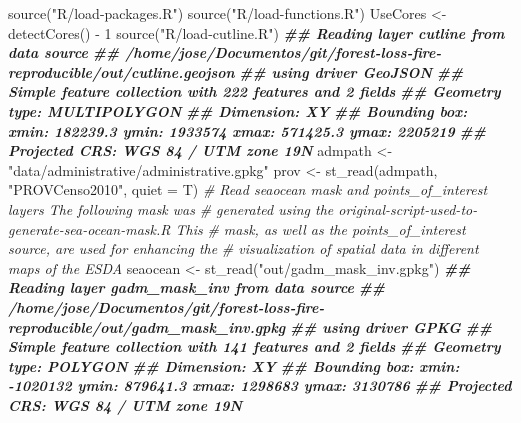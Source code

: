 \documentclass[10pt,landscape,a3paper]{article}
\newenvironment{Shaded}{\begin{snugshade}}{\end{snugshade}}
\newcommand{\AttributeTok}[1]{\textcolor[rgb]{0.77,0.63,0.00}{#1}}
\newcommand{\CommentTok}[1]{\textcolor[rgb]{0.56,0.35,0.01}{\textit{#1}}}
\newcommand{\DecValTok}[1]{\textcolor[rgb]{0.00,0.00,0.81}{#1}}
\newcommand{\DocumentationTok}[1]{\textcolor[rgb]{0.56,0.35,0.01}{\textbf{\textit{#1}}}}
\newcommand{\FunctionTok}[1]{\textcolor[rgb]{0.00,0.00,0.00}{#1}}
\newcommand{\NormalTok}[1]{#1}
\newcommand{\OtherTok}[1]{\textcolor[rgb]{0.56,0.35,0.01}{#1}}
\newcommand{\SpecialCharTok}[1]{\textcolor[rgb]{0.00,0.00,0.00}{#1}}
\newcommand{\StringTok}[1]{\textcolor[rgb]{0.31,0.60,0.02}{#1}}
\begin{document}
\begin{Shaded}
\begin{Highlighting}[]
\FunctionTok{source}\NormalTok{(}\StringTok{"R/load{-}packages.R"}\NormalTok{)}
\FunctionTok{source}\NormalTok{(}\StringTok{"R/load{-}functions.R"}\NormalTok{)}
\NormalTok{UseCores }\OtherTok{\textless{}{-}} \FunctionTok{detectCores}\NormalTok{() }\SpecialCharTok{{-}} \DecValTok{1}
\FunctionTok{source}\NormalTok{(}\StringTok{"R/load{-}cutline.R"}\NormalTok{)}
\DocumentationTok{\#\# Reading layer \textasciigrave{}cutline\textquotesingle{} from data source }
\DocumentationTok{\#\#   \textasciigrave{}/home/jose/Documentos/git/forest{-}loss{-}fire{-}reproducible/out/cutline.geojson\textquotesingle{} }
\DocumentationTok{\#\#   using driver \textasciigrave{}GeoJSON\textquotesingle{}}
\DocumentationTok{\#\# Simple feature collection with 222 features and 2 fields}
\DocumentationTok{\#\# Geometry type: MULTIPOLYGON}
\DocumentationTok{\#\# Dimension:     XY}
\DocumentationTok{\#\# Bounding box:  xmin: 182239.3 ymin: 1933574 xmax: 571425.3 ymax: 2205219}
\DocumentationTok{\#\# Projected CRS: WGS 84 / UTM zone 19N}
\NormalTok{admpath }\OtherTok{\textless{}{-}} \StringTok{"data/administrative/administrative.gpkg"}
\NormalTok{prov }\OtherTok{\textless{}{-}} \FunctionTok{st\_read}\NormalTok{(admpath, }\StringTok{"PROVCenso2010"}\NormalTok{, }\AttributeTok{quiet =}\NormalTok{ T)}
\CommentTok{\# Read seaocean mask and points\_of\_interest layers The following mask was}
\CommentTok{\# generated using the \textquotesingle{}original{-}script{-}used{-}to{-}generate{-}sea{-}ocean{-}mask.R\textquotesingle{} This}
\CommentTok{\# mask, as well as the points\_of\_interest source, are used for enhancing the}
\CommentTok{\# visualization of spatial data in different maps of the ESDA}
\NormalTok{seaocean }\OtherTok{\textless{}{-}} \FunctionTok{st\_read}\NormalTok{(}\StringTok{"out/gadm\_mask\_inv.gpkg"}\NormalTok{)}
\DocumentationTok{\#\# Reading layer \textasciigrave{}gadm\_mask\_inv\textquotesingle{} from data source }
\DocumentationTok{\#\#   \textasciigrave{}/home/jose/Documentos/git/forest{-}loss{-}fire{-}reproducible/out/gadm\_mask\_inv.gpkg\textquotesingle{} }
\DocumentationTok{\#\#   using driver \textasciigrave{}GPKG\textquotesingle{}}
\DocumentationTok{\#\# Simple feature collection with 141 features and 2 fields}
\DocumentationTok{\#\# Geometry type: POLYGON}
\DocumentationTok{\#\# Dimension:     XY}
\DocumentationTok{\#\# Bounding box:  xmin: {-}1020132 ymin: 879641.3 xmax: 1298683 ymax: 3130786}
\DocumentationTok{\#\# Projected CRS: WGS 84 / UTM zone 19N}

\end{Highlighting}
\end{Shaded}
\end{document}
